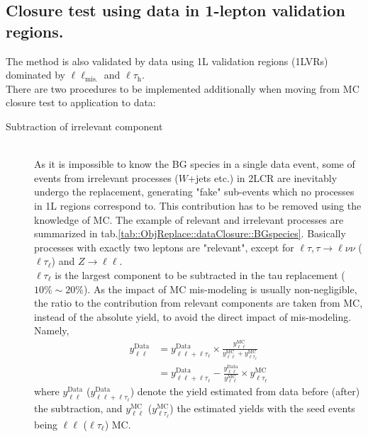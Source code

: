 


\clearpage
\subsection{Closure test using data in 1-lepton validation regions.} \label{sec::ObjReplace::dataClosure}
The method is also validated by data using 1L validation regions (1LVRs) dominated by $\ell\ell_{\mathrm{mis.}}$ and $\ell\tau_{\mathrm{h}}$. \\
There are two procedures to be implemented additionally when moving from MC closure test to application to data:

\begin{description}
\item [Subtraction of irrelevant component] \mbox{} \\
As it is impossible to know the BG species in a single data event, some of events from irrelevant processes ($W$+jets etc.) in 2LCR are inevitably undergo the replacement, generating "fake" sub-events which no processes in 1L regions correspond to. This contribution has to be removed using the knowledge of MC.
The example of relevant and irrelevant processes are summarized in tab.\ref{tab::ObjReplace::dataClosure::BGspecies}. Basically processes with exactly two leptons are "relevant", except for $\ell\tau, \tau\rightarrow \ell\nu\nu$ ($\ell\tau_{\ell}$) and $Z\rightarrow\ell\ell$.\\
$\ell\tau_{\ell}$ is the largest component to be subtracted in the tau replacement ($10\%\sim20\%$). As the impact of MC mis-modeling is usually non-negligible, the ratio to the contribution from relevant components are taken from MC, instead of the absolute yield, to avoid the direct impact of mis-modeling. Namely,
\begin{align}
  y^{\mathrm{Data}}_{\ell\ell} 
  & = y^{\mathrm{Data}}_{\ell\ell+\ell\tau_{\ell}} \times \frac{y^{\mathrm{MC}}_{\ell\ell}}{y^{\mathrm{MC}}_{\ell\ell}+y^{\mathrm{MC}}_{\ell\tau_{\ell}}} \\ 
  & = y^{\mathrm{Data}}_{\ell\ell+\ell\tau_{\ell}} - \frac{y^{\mathrm{Data}}_{\ell\ell}}{y^{\mathrm{MC}}_{\ell\ell}} \times y^{\mathrm{MC}}_{\ell\tau_{\ell}}
\end{align}
where $y^{\mathrm{Data}}_{\ell\ell}$ ($y^{\mathrm{Data}}_{\ell\ell+\ell\tau_{\ell}}$) denote the yield estimated from data before (after) the subtraction, and $y^{\mathrm{MC}}_{\ell\ell}$ ($y^{\mathrm{MC}}_{\ell\tau_{\mathrm{\ell}}}$) the estimated yields with the seed events being $\ell\ell$ ($\ell\tau_{\mathrm{\ell}}$) MC. \\


\end{description}

